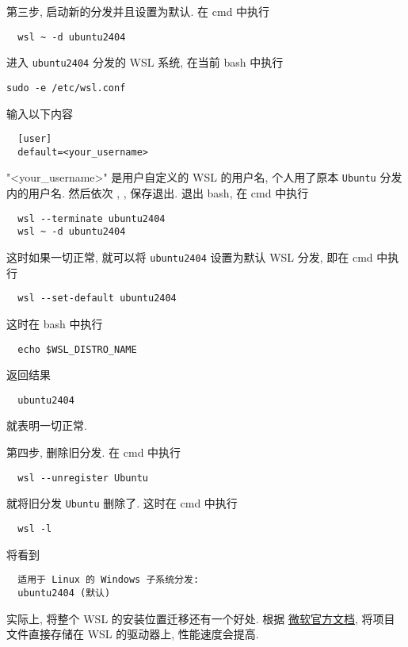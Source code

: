第三步,
启动新的分发并且设置为默认.
在 \textsf{cmd} 中执行
\begin{lstlisting}
  wsl ~ -d ubuntu2404
\end{lstlisting}
进入 \texttt{ubuntu2404} 分发的 WSL 系统,
在当前 \textsf{bash} 中执行
\begin{lstlisting}[deletekeywords = wsl]
  sudo -e /etc/wsl.conf
\end{lstlisting}
输入以下内容
\begin{lstlisting}
  [user]
  default=<your_username>
\end{lstlisting}
"<your_username>" 是用户自定义的 WSL 的用户名,
个人用了原本 \texttt{Ubuntu} 分发内的用户名.
然后依次 , , \keys{\enter} 保存退出.
退出 \textsf{bash},
在 \textsf{cmd} 中执行
\begin{lstlisting}
  wsl --terminate ubuntu2404
  wsl ~ -d ubuntu2404
\end{lstlisting}
这时如果一切正常,
就可以将 \texttt{ubuntu2404} 设置为默认 WSL 分发,
即在 \textsf{cmd} 中执行
\begin{lstlisting}
  wsl --set-default ubuntu2404
\end{lstlisting}
这时在 \textsf{bash} 中执行
\begin{lstlisting}
  echo $WSL_DISTRO_NAME
\end{lstlisting}
返回结果
\begin{lstlisting}
  ubuntu2404
\end{lstlisting}
就表明一切正常.

第四步,
删除旧分发.
在 \textsf{cmd} 中执行
\begin{lstlisting}
  wsl --unregister Ubuntu
\end{lstlisting}
就将旧分发 \texttt{Ubuntu} 删除了.
这时在 \textsf{cmd} 中执行
\begin{lstlisting}
  wsl -l
\end{lstlisting}
将看到
\begin{lstlisting}
  适用于 Linux 的 Windows 子系统分发:
  ubuntu2404 (默认)
\end{lstlisting}

实际上,
将整个 WSL 的安装位置迁移还有一个好处.
根据%
\href{https://learn.microsoft.com/zh-cn/windows/wsl/filesystems#file-storage-and-performance-across-file-systems}{微软官方文档},
将项目文件直接存储在 WSL 的驱动器上,
性能速度会提高.
